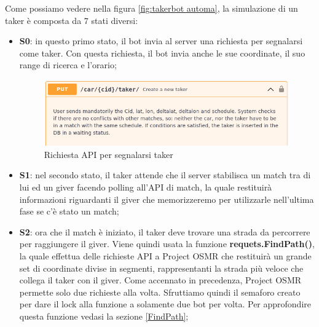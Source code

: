 \documentclass[main.tex]{subfiles}
\begin{document}
Come possiamo vedere nella figura \ref{fig:takerbot automa}, la simulazione di un taker è composta da 7 stati diversi:
\begin{itemize}
    \item \textbf{S0}: in questo primo stato, il bot invia al server una richiesta per segnalarsi come taker. Con questa richiesta, il bot invia anche le sue coordinate, il suo range di ricerca e l'orario; 
    \begin{figure}[H]
        \centering
        \includegraphics[width=1.1\linewidth]       {img/simulazione/takerbot/taker-request.png}
        \caption{Richiesta API per segnalarsi taker}
        \label{fig:taker request}
    \end{figure}
    


    \item \textbf{S1}: nel secondo stato, il taker attende che il server stabilisca un match tra di lui ed un giver facendo polling all'API di match, la quale restituirà informazioni riguardanti il giver che memorizzeremo per utilizzarle nell'ultima fase se c'è stato un match;

     
    
    \item \textbf{S2}: ora che il match è iniziato, il taker deve trovare una strada da percorrere per raggiungere il giver. Viene quindi usata la funzione \textbf{requets.FindPath()}, la quale effettua delle richieste API a Project OSMR \cite{osmr} che restituirà un grande set di coordinate divise in segmenti, rappresentanti la strada più veloce che collega il taker con il giver. \newline
    Come accennato in precedenza, Project OSMR permette solo due richieste alla volta. Sfruttiamo quindi il semaforo creato per dare il lock alla funzione a solamente due bot per volta. \newline
    Per approfondire questa funzione vedasi la sezione \ref{FindPath};

    
    

\end{itemize}
\end{document}
